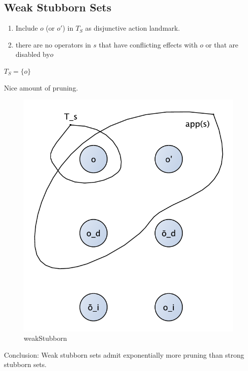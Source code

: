 \documentclass[11pt,a4paper]{article}
\begin{document}
\subsection*{Weak Stubborn Sets}
\begin{enumerate}
\item Include $o$ (or $o'$) in $T_S$ as disjunctive action landmark.
\item there are no operators in $s$ that have conflicting effects with $o$ or that are disabled by$o$
\end{enumerate}
$T_S = \{o\} $

Nice amount of pruning.

\begin{figure}[h!]
\centering
\includegraphics[scale=0.4]{weakStubborn}
\caption{weakStubborn}
\end{figure}

Conclusion: Weak stubborn sets admit exponentially more pruning than strong stubborn sets.

\label{lastpage}
\end{document}
